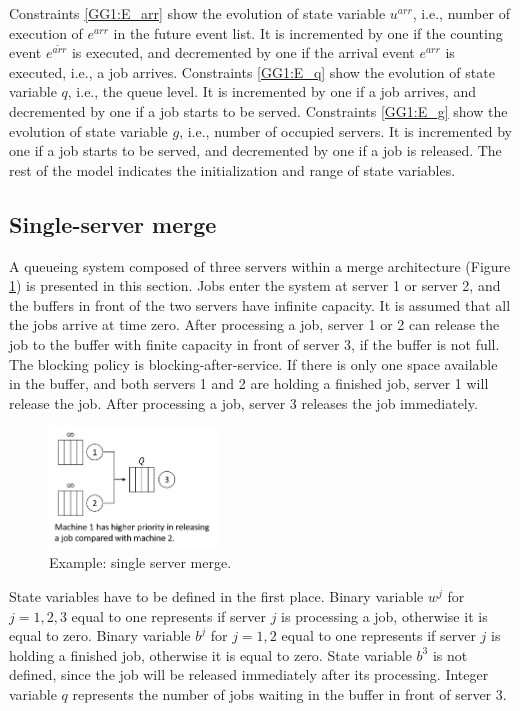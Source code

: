 \documentclass[]{interact}
\theoremstyle{plain}%
\theoremstyle{definition}
\theoremstyle{remark}
\begin{document}
Constraints \eqref{GG1:E_arr} show the evolution of state variable $u^{arr}$, i.e., number of execution of $e^{arr}$ in the future event list. It is incremented by one if the counting event $e^{\tilde{arr}}$ is executed, and decremented by one if the arrival event $e^{arr}$ is executed, i.e., a job arrives. 
Constraints \eqref{GG1:E_q} show the evolution of state variable $q$, i.e., the queue level. It is incremented by one if a job arrives, and decremented by one if a job starts to be served. 
Constraints \eqref{GG1:E_g} show the evolution of state variable $g$, i.e., number of occupied servers. It is incremented by one if a job starts to be served, and decremented by one if a job is released. The rest of the model indicates the initialization and range of state variables.


\subsection{Single-server merge}

A queueing system composed of three servers within a merge architecture (Figure \ref{fig:merge}) is presented in this section. Jobs enter the system at server 1 or server 2, and the buffers in front of the two servers have infinite capacity. It is assumed that all the jobs arrive at time zero. After processing a job, server 1 or 2 can release the job to the buffer with finite capacity in front of server 3, if the buffer is not full. The blocking policy is blocking-after-service. If there is only one space available in the buffer, and both servers 1 and 2 are holding a finished job, server 1 will release the job. After processing a job, server 3 releases the job immediately. 

\begin{figure}[h]
	\centering
	\includegraphics[width=0.4\textwidth]{Figures/merge.png}
	\caption{Example: single server merge.}
	\label{fig:merge}
\end{figure}

State variables have to be defined in the first place. Binary variable $w^{j}$ for $j=1,2,3$ equal to one represents if server $j$ is processing a job, otherwise it is equal to zero. Binary variable $b^{j}$ for $j=1,2$ equal to one represents if server $j$ is holding a finished job, otherwise it is equal to zero. State variable $b^3$ is not defined, since the job will be released immediately after its processing. Integer variable $q$ represents the number of jobs waiting in the buffer in front of server 3. 
\end{document}
